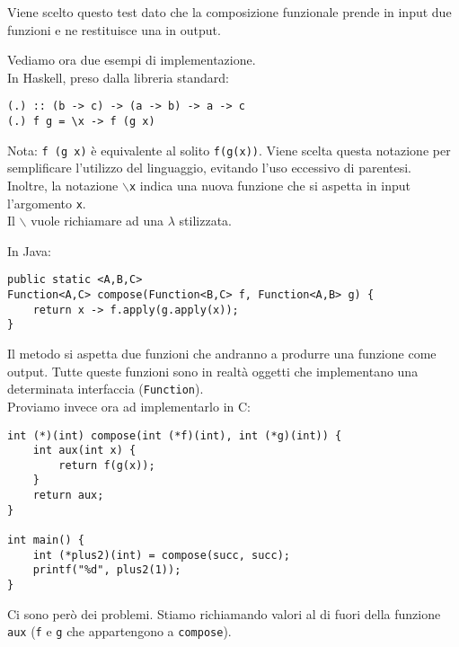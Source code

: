 \documentclass{article}
\begin{document}
Viene scelto questo test dato che la composizione funzionale prende in input due funzioni e ne restituisce una in output.

Vediamo ora due esempi di implementazione.\\
In Haskell, preso dalla libreria standard:
\begin{tcolorbox}
\begin{verbatim}
(.) :: (b -> c) -> (a -> b) -> a -> c
(.) f g = \x -> f (g x)
\end{verbatim}
\end{tcolorbox}

Nota: \texttt{f (g x)} è equivalente al solito \texttt{f(g(x))}. Viene scelta questa notazione per semplificare l'utilizzo del linguaggio, evitando l'uso eccessivo di parentesi.\\
Inoltre, la notazione \texttt{$\backslash$x} indica una nuova funzione che si aspetta in input l'argomento \texttt{x}.\\
Il \texttt{$\backslash$} vuole richiamare ad una $\lambda$ stilizzata.

In Java:
\begin{tcolorbox}
\begin{verbatim}
public static <A,B,C>
Function<A,C> compose(Function<B,C> f, Function<A,B> g) {
    return x -> f.apply(g.apply(x));
}
\end{verbatim}
\end{tcolorbox}

Il metodo si aspetta due funzioni che andranno a produrre una funzione come output. Tutte queste funzioni sono in realtà oggetti che implementano una determinata interfaccia (\texttt{Function}).\vspace{14pt}\\
Proviamo invece ora ad implementarlo in C:
\begin{tcolorbox}
\begin{verbatim}
int (*)(int) compose(int (*f)(int), int (*g)(int)) {
    int aux(int x) {
        return f(g(x));
    }
    return aux;
}

int main() {
    int (*plus2)(int) = compose(succ, succ);
    printf("%d", plus2(1));
}
\end{verbatim}
\end{tcolorbox}

Ci sono però dei problemi. Stiamo richiamando valori al di fuori della funzione \texttt{aux} (\texttt{f} e \texttt{g} che appartengono a \texttt{compose}).
\end{document}
